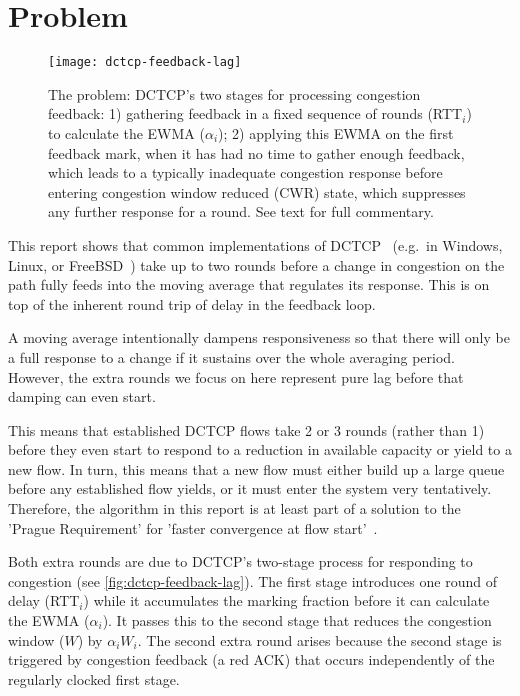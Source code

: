 \section{Problem}\label{prresp_Problem}

\begin{figure*}
	\texttt{[image: dctcp-feedback-lag]}
	\caption{The problem: DCTCP's two stages for processing congestion feedback: 1)
	gathering feedback in a fixed sequence of rounds (RTT\(_i\)) to calculate the
	EWMA (\(\alpha_i\)); 2) applying this EWMA on the first feedback mark, when it
	has had no time to gather enough feedback, which leads to a typically
	inadequate congestion response before entering congestion window reduced (CWR)
	state, which suppresses any further response for a round. See text for full
	commentary.}
	\label{fig:dctcp-feedback-lag}
\end{figure*}

This report shows that common implementations of DCTCP~\cite{Alizadeh10:DCTCP} (e.g.\ in Windows,
Linux, or FreeBSD~\cite{Bensley17:DCTCP}) take up to two rounds before a change in
congestion on the path fully feeds into the moving average that regulates its
response. This is on top of the inherent round trip of delay in the feedback loop. 

A moving average intentionally dampens responsiveness so that there will only be a full response to a change if it sustains over the whole averaging period. However, the extra rounds we focus on here represent pure lag before that damping can even start. 

This means that established DCTCP flows take 2 or 3 rounds (rather than 1) before they even start to respond to a reduction in available capacity or yield to a new flow. In turn, this means that a new flow must either build up a large queue before any established flow yields, or it must enter the system very tentatively. Therefore, the algorithm in this report is at least part of a solution to the 'Prague Requirement' for 'faster convergence at flow start'~\cite[Appx A.2.3]{Briscoe15f:ecn-l4s-id_ID}.

Both extra rounds are due to DCTCP's two-stage process for responding to congestion (see \autoref{fig:dctcp-feedback-lag}). The
first stage introduces one round of delay (RTT\(_i\)) while it accumulates the
marking fraction before it can calculate the EWMA (\(\alpha_i\)). It
passes this to the second stage that reduces the congestion window
(\(W\)) by \(\alpha_i W_i\). The second extra round arises because the
second stage is triggered by congestion feedback (a red
ACK) that occurs independently of the regularly clocked first stage. 

